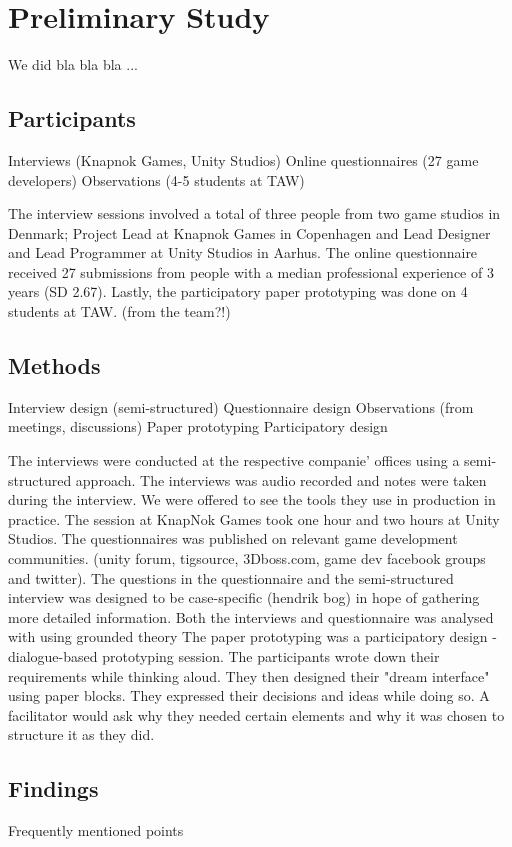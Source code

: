\section{Preliminary Study}
We did bla bla bla ...

\subsection{Participants}
	Interviews (Knapnok Games, Unity Studios)
	Online questionnaires (27 game developers)
	Observations (4-5 students at TAW)
	
	The interview sessions involved a total of three people from two game studios in Denmark; Project Lead at Knapnok Games in Copenhagen and Lead Designer and Lead Programmer at Unity Studios in Aarhus.
The online questionnaire received 27 submissions from people with a median professional experience of 3 years (SD 2.67).
Lastly, the participatory paper prototyping was done on 4 students at TAW. (from the team?!)

	
\subsection{Methods}
		Interview design (semi-structured)
		Questionnaire design
		Observations (from meetings, discussions)
		Paper prototyping
		Participatory design
		
		The interviews were conducted at the respective companie' offices using a semi-structured approach. The interviews was audio recorded and notes were taken during the interview. We were offered to see the tools they use in production in practice. The session at KnapNok Games took one hour and two hours at Unity Studios.
The questionnaires was published on relevant game development communities. (unity forum, tigsource, 3Dboss.com, game dev facebook groups and twitter). The questions in the questionnaire and the semi-structured interview was designed to be case-specific (hendrik bog) in hope of gathering more detailed information. Both the interviews and questionnaire was analysed with using grounded theory
The paper prototyping was a participatory design - dialogue-based prototyping session. The participants wrote down their requirements while thinking aloud. They then designed their "dream interface" using paper blocks. They expressed their decisions and ideas while doing so. A facilitator would ask why they needed certain elements and why it was chosen to structure it as they did.


\subsection{Findings}
	Frequently mentioned points
	
